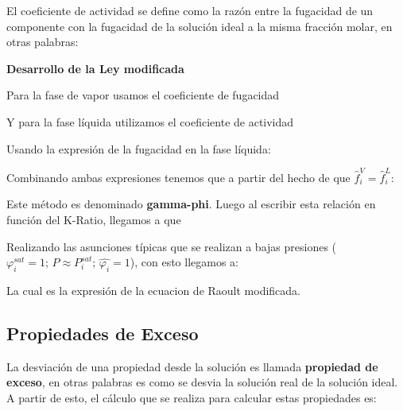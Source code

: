 El coeficiente de actividad se define como la razón entre la fugacidad de un componente con la fugacidad de la solución ideal a la misma fracción molar, en otras palabras:


\textbf{Desarrollo de la Ley modificada}

Para la fase de vapor usamos el coeficiente de fugacidad


Y para la fase líquida utilizamos el coeficiente de actividad


Usando la expresión de la fugacidad en la fase líquida:


Combinando ambas expresiones tenemos que a partir del hecho de que $\hat{f}_i^{V}=\hat{f}_i^{L}$:


Este método es denominado \textbf{gamma-phi}. Luego al escribir esta relación en función del K-Ratio, llegamos a que 

Realizando las asunciones típicas que se realizan a bajas presiones ($\varphi_i^{sat}=1;\, P\approx P^{sat}_i;\, \hat{\varphi_i}=1$), con esto llegamos a:

La cual es la expresión de la ecuacion de Raoult modificada.

\subsection{Propiedades de Exceso}

La desviación de una propiedad desde la solución es llamada \textbf{propiedad de exceso}, en otras palabras es como se desvia la solución real de la solución ideal. A partir de esto, el cálculo que se realiza 
para calcular estas propiedades es:

